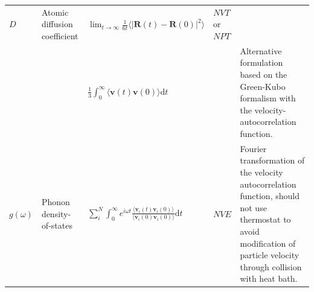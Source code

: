 \begin{table}[tbh]
\begin{tabular}{p{2.8cm}p{2.5cm}llp{4cm}}
        $D$ & Atomic diffusion coefficient & $\displaystyle{\lim_{t\to\infty}\frac{1}{6t}\langle |\bm{R}(t)-\bm{R}(0)|^2\rangle }$ & $NVT$ or $NPT$ & \\
            & &$\displaystyle{\frac{1}{3}}\int_0^\infty \langle \bm{v}(t)\bm{v}(0)\rangle \mbox{d}t$ & & Alternative formulation based on the Green-Kubo formalism with the velocity-autocorrelation function.\\
        $g(\omega)$ & Phonon density-of-states & $\displaystyle{\sum_{i}^{N}\int_0^\infty e^{i\omega t} \frac{\langle\bm{v}_i (t)\bm{v}_i(0)\rangle}{\langle\bm{v}_i (0)\bm{v}_i(0)\rangle} \mbox{d}t}$ & $NVE$ & Fourier transformation of the velocity autocorrelation function, should not use thermostat to avoid modification of particle velocity through collision with heat bath.\\
     \hline\hline
    \end{tabular}
    
    
\end{table}
